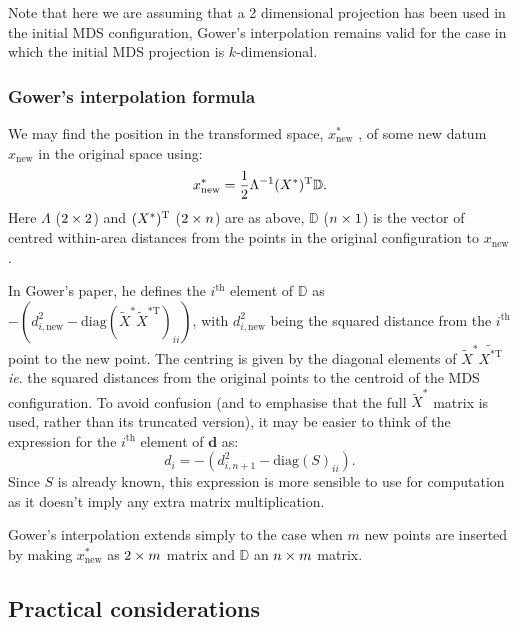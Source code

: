 Note that here we are assuming that a 2 dimensional projection has been used in the initial MDS configuration, Gower's interpolation remains valid for the case in which the initial MDS projection is $k$-dimensional.

\subsubsection{Gower's interpolation formula}

We may find the position in the transformed space, $x^*_{\text{new}}$ , of some new datum $x_{\text{new}}$ in the original space using:
\begin{equation}
x^*_{\text{new}} = \frac{1}{2} \Lambda^{-1} (X^*)^{\text{T}} \mathbb{D}.
\label{gower}
\end{equation}
Here $\Lambda$ ($2 \times 2$) and $(X^*)^{\text{T}}$ ($2 \times n$) are as above, $\mathbb{D}$ ($n \times 1$) is the vector of centred within-area distances from the points in the original configuration to $x_{\text{new}}$.

In Gower's paper, he defines the $i^\text{th}$ element of $\mathbb{D}$ as $-(d^2_{i,\text{new}}-\text{diag}(\tilde{X}^* \tilde{X}^{*\text{T}})_{ii})$, with $d^2_{i,\text{new}}$ being the squared distance from the $i^\text{th}$ point to the new point. The centring is given by the diagonal elements of $\tilde{X}^*\tilde{X^{* \text{T}}}$ \emph{ie}. the squared distances from the original points to the centroid of the MDS configuration. To avoid confusion (and to emphasise that the full $\tilde{X}^*$ matrix is used, rather than its truncated version), it may be easier to think of the expression for the $i^\text{th}$ element of $\mathbf{d}$ as:
\begin{equation}
d_{i} = -(d^2_{i,n+1}-\text{diag}(S)_{ii}).
\end{equation}
Since $S$ is already known, this expression is more sensible to use for computation as it doesn't imply any extra matrix multiplication.

Gower's interpolation extends simply to the case when $m$ new points are inserted by making $x^*_{\text{new}}$ as $2 \times m$ matrix and $\mathbb{D}$ an $n \times m$ matrix.


\subsection{Practical considerations}

